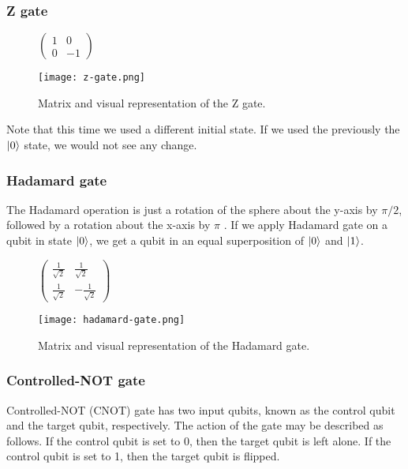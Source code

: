 \subsubsection{Z gate}
\begin{figure}[H]
    \centering
    \begin{minipage}{0.4\linewidth}
      \centering
      $\begin{pmatrix}
        1 & 0 \\
        0 & -1
        \end{pmatrix}$
      \vfill
    \end{minipage}
    \begin{minipage}{0.25\linewidth}
      \centering
      \texttt{[image: z-gate.png]}
      \vfill
    \end{minipage}
    \caption{Matrix and visual representation of the Z gate.}
\end{figure}

Note that this time we used a different initial state. If we used the previously the $\lvert0\rangle$ state, we would not see any change.
\subsubsection{Hadamard gate}
The Hadamard operation is just a rotation of the sphere about the y-axis by $\pi/2$, followed by
a rotation about the x-axis by $\pi$ \cite{qc}. If we apply Hadamard gate on a qubit in state $\lvert0\rangle$, we get a qubit in an equal superposition of $\lvert0\rangle$ and $\lvert1\rangle$.
\begin{figure}[H]
    \centering
    \begin{minipage}{0.4\linewidth}
      \centering
      $\begin{pmatrix} 
        \frac{1}{\sqrt{2}} &  \frac{1}{\sqrt{2}}  \\
        \frac{1}{\sqrt{2}}  &  -\frac{1}{\sqrt{2}} 
        \end{pmatrix}$
      \vfill
    \end{minipage}
    \begin{minipage}{0.25\linewidth}
      \centering
      \texttt{[image: hadamard-gate.png]}
      \vfill
    \end{minipage}
    \caption{Matrix and visual representation of the Hadamard gate.}
\end{figure}
\subsubsection{Controlled-NOT gate} 
Controlled-NOT (CNOT) gate has two input qubits, known as the control qubit and the target qubit, respectively. The action of the gate may be described as follows. If the control qubit is set to 0, then the target qubit is left alone. If the control qubit is set to 1, then the target qubit is flipped. \cite{qc}

